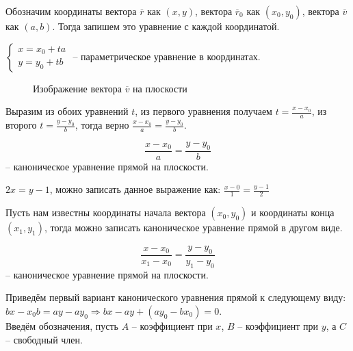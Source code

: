 	Обозначим координаты вектора $\overline{r}$ как $(x, y)$, вектора $\overline{r}_0$ как $(x_0, y_0)$, вектора $\overline{v}$ как $(a, b)$. Тогда запишем это уравнение с каждой координатой.

	\begin{Def}
		$ \begin{cases}
			x = x_0 + ta\\
			y = y_0 + tb
		\end{cases} $ -- параметрическое уравнение в координатах.
	\end{Def}

	\begin{figure*}[h]
		\centering
		\def\svgwidth{0.5\columnwidth}
		
		\caption{Изображение вектора $\overline{v}$ на плоскости}
	\end{figure*}
	Выразим из обоих уравнений $t$, из первого уравнения получаем $t = \frac{x - x_0}{a}$, из второго $t = \frac{y - y_0}{b}$, тогда верно $\frac{x-x_0}{a} = \frac{y - y_0}{b}$.

	\begin{Def}
		$$\frac{x-x_0}{a} = \frac{y - y_0}{b}$$ -- каноническое уравнение прямой на плоскости.
	\end{Def}

	\begin{Example}
		$2x = y - 1$, можно записать данное выражение как: $\frac{x - 0}{1} = \frac{y - 1}{2}$
	\end{Example}

	Пусть нам известны координаты начала вектора $(x_0, y_0)$ и координаты конца $(x_1, y_1)$, тогда можно записать каноническое уравнение прямой в другом виде.

	\begin{figure*}[h]
		\centering
		\def\svgwidth{0.2\columnwidth}
		
	\end{figure*}

	\begin{Def}
		$$\frac{x-x_0}{x_1 - x_0} = \frac{y - y_0}{y_1 - y_0}$$ -- каноническое уравнение прямой на плоскости.
	\end{Def}

	Приведём первый вариант канонического уравнения прямой к следующему виду: \\
	$bx - x_0b = ay - ay_0 \Rightarrow bx - ay + (ay_0 -bx_0) = 0$.\\
	Введём обозначения, пусть $A$ -- коэффициент при $x$, $B$ -- коэффициент при $y$, а $C$ -- свободный член.

